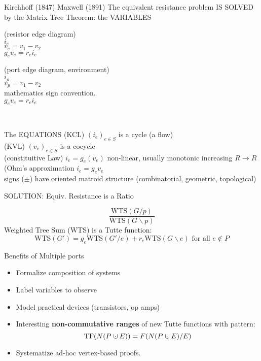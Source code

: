 \documentclass{beamer}
\newcommand{\dunion}
{\mbox{\hbox{\hskip0.45em$\cdot$\hskip-0.44em$\cup$\hskip0.2em}}}
\begin{document}
\begin{frame}{Kirchhoff (1847)
\cite{Kirchhoff}
 Maxwell (1891)
\cite{MaxR} 
The equivalent resistance problem IS SOLVED
by the Matrix Tree Theorem: the VARIABLES}

\begin{minipage}{.4\textwidth}
(resistor edge diagram)\\
$i_e$\\
$v_e=v_1-v_2$\\
$g_ev_e=r_ei_e$
\end{minipage}
\begin{minipage}{.4\textwidth}
(port edge diagram, environment)\\
$i_p$\\
$v_p=v_1-v_2$\\
mathematics sign convention.\\
$g_ev_e=r_ei_e$
\end{minipage}\\
\end{frame}

\begin{frame}{The EQUATIONS}
(KCL) $(i_e)_{e\in S}$ is a cycle (a flow)\\
(KVL) $(v_e)_{e\in S}$ is a cocycle\\
(constituitive Law) $i_e=g_e(v_e)$
non-linear, usually monotonic increasing $R\rightarrow R$ 
(Ohm's approximation $i_e=g_ev_e$\\
signs ($\pm$) have oriented matroid structure
(combinatorial, geometric, topological)\\
\end{frame}



\begin{frame}{SOLUTION: Equiv. Resistance is a Ratio}

\[
\frac{\mbox{WTS}(G/p)}
{\mbox{WTS}(G\backslash p)}
\]
Weighted Tree Sum (WTS) is a Tutte function:
\[
\mbox{WTS}(G') =
g_e \mbox{WTS}(G'/e) + r_e \mbox{WTS} (G \backslash e)
\text{\ for all\ }e \not\in P
\]
\end{frame}

\begin{frame}{Benefits of Multiple ports}

\begin{itemize}
\item
Formalize composition of systems\cite{NarayananDecompVS1986}
\item
Label variables to observe
\item
Model practical devices (transistors, op amps)
\item
Interesting \textbf{non-commutative ranges} of
new Tutte functions with pattern:
\[
\text{TF}(N(P\dunion E)) = F(N(P\dunion E)/E)
\]
\item
Systematize ad-hoc vertex-based proofs.
\end{itemize}
\end{frame}
\end{document}
